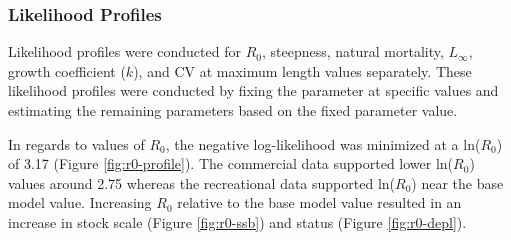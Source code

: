 \documentclass[11pt,
  english,
  a4paper,
]{article}
\begin{document}
\leavevmode\tagmcend\tagstructend\par


\hypertarget{likelihood-profiles}{%
\subsubsection{Likelihood Profiles}\label{likelihood-profiles}}

\leavevmode\tagmcend\tagstructend


Likelihood profiles were conducted for {\(R_0\)\leavevmode\tagmcend\tagstructend}, steepness, natural mortality, {\(L_{\infty}\)\leavevmode\tagmcend\tagstructend}, growth coefficient ({\(k\)\leavevmode\tagmcend\tagstructend}), and CV at maximum length values separately. These likelihood profiles were conducted by fixing the parameter at specific values and estimating the remaining parameters based on the fixed parameter value.

\leavevmode\tagmcend\tagstructend\par


In regards to values of {\(R_0\)\leavevmode\tagmcend\tagstructend}, the negative log-likelihood was minimized at a ln({\(R_0\)\leavevmode\tagmcend\tagstructend}) of 3.17 (Figure \ref{fig:r0-profile}). The commercial data supported lower ln({\(R_0\)\leavevmode\tagmcend\tagstructend}) values around 2.75 whereas the recreational data supported ln({\(R_0\)\leavevmode\tagmcend\tagstructend}) near the base model value. Increasing {\(R_0\)\leavevmode\tagmcend\tagstructend} relative to the base model value resulted in an increase in stock scale (Figure \ref{fig:r0-ssb}) and status (Figure \ref{fig:r0-depl}).

\leavevmode\tagmcend\tagstructend\par

\end{document}
